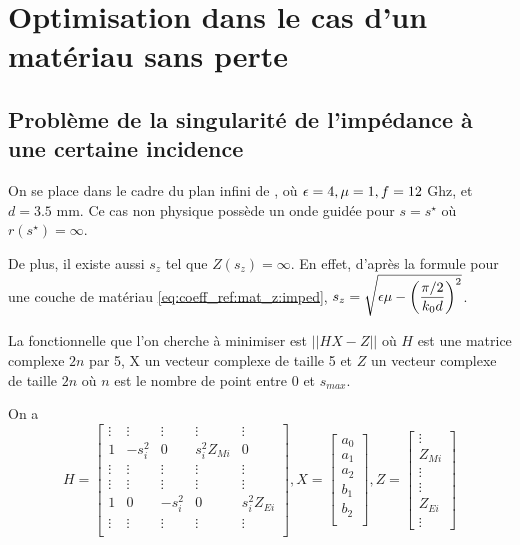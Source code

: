 \section{Optimisation dans le cas d'un matériau sans perte}

\subsection{Problème de la singularité de l'impédance à une certaine incidence}
On se place dans le cadre du plan infini de \cite{soudais_3d_2017}, où \(\epsilon=4,\mu=1,f=12\) Ghz, et \(d=3.5\) mm. Ce cas non physique possède un onde guidée pour \(s=s^\star\) où \(r(s^\star) = \infty\). 

De plus, il existe aussi \(s_z\) tel que \(Z(s_z) = \infty\). En effet, d'après la formule pour une couche de matériau \eqref{eq:coeff_ref:mat_z:imped}, \(s_z = \sqrt{\epsilon \mu - \left(\dfrac{\pi/2}{k_0 d}\right)^2}\).

La fonctionnelle que l'on cherche à minimiser est \(||H X - Z||\) où \(H\) est une matrice complexe \(2n\) par 5, X un vecteur complexe de taille 5 et \(Z\) un vecteur complexe de taille \(2n\) où \(n\) est le nombre de point entre 0 et \(s_{max}\). 


On a 
\[
  H = \begin{bmatrix}
  \vdots & \vdots & \vdots & \vdots &\vdots \\
  1 & -s_i^2 & 0 & s_i^2 Z_{Mi} & 0 \\
  \vdots & \vdots & \vdots & \vdots &\vdots \\
  \vdots & \vdots & \vdots & \vdots &\vdots \\
  1 & 0 &-s_i^2 & 0 & s_i^2 Z_{Ei} \\
  \vdots & \vdots & \vdots & \vdots &\vdots \\
  \end{bmatrix},
  X = \begin{bmatrix}
  a_0\\
  a_1\\
  a_2\\
  b_1\\
  b_2\\
  \end{bmatrix},
  Z=\begin{bmatrix}
  \vdots\\
  Z_{Mi}\\
  \vdots\\
  \vdots\\
  Z_{Ei}\\
  \vdots
  \end{bmatrix}
\]

